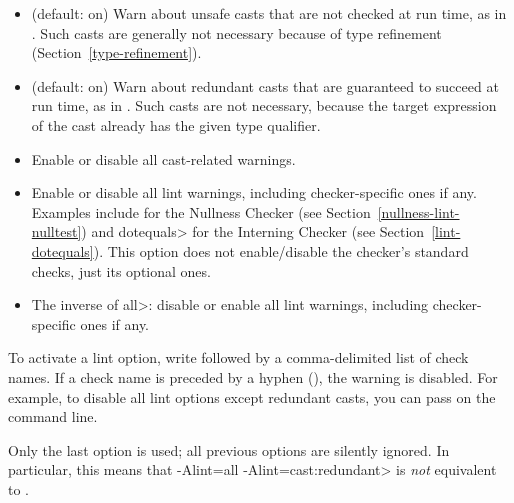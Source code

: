 \begin{itemize}

\item
   (default: on) Warn about unsafe casts that are not
  checked at run time, as in .  Such casts
  are generally not necessary because of type refinement
  (Section~\ref{type-refinement}).

\item
   (default: on) Warn about redundant
  casts that are guaranteed to succeed at run time,
  as in .  Such casts are not necessary,
  because the target expression of the cast already has the given type
  qualifier.

\item
   Enable or disable all cast-related warnings.

\item
\begin{sloppypar}
   Enable or disable all lint warnings, including
  checker-specific ones if any.  Examples include  for the
  Nullness Checker (see Section~\ref{nullness-lint-nulltest}) and \<dotequals> for
  the Interning Checker (see Section~\ref{lint-dotequals}).  This option
  does not enable/disable the checker's standard checks, just its optional
  ones.
\end{sloppypar}

\item
   The inverse of \<all>:  disable or enable all lint warnings,
  including checker-specific ones if any.

\end{itemize}


\noindent
To activate a lint option, write  followed by a
comma-delimited list of check names.  If a check name is preceded by a
hyphen (\code{-}), the warning is disabled.  For example, to disable all
lint options except redundant casts, you can pass
 on the command line.

Only the last  option is used; all previous 
options are silently ignored.  In particular, this means that \<-Alint=all
-Alint=cast:redundant> is \emph{not} equivalent to
.


